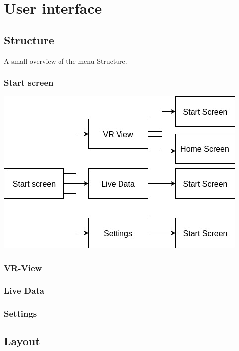 \section{User interface}

\subsection{Structure}

A small overview of the menu Structure.

\subsubsection{Start screen}

\includegraphics[scale=0.5]{pics/startscreen.jpg}

\subsubsection{VR-View}



\subsubsection{Live Data}


\subsubsection{Settings}


\subsection{Layout}

